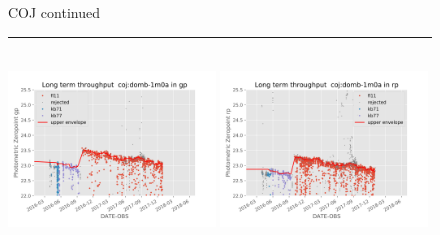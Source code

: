 \documentclass[draft]{spieman}
\begin{document}
\begin{figure}\ContinuedFloat
\centering 
COJ continued \\ 
\rule{\textwidth}{0.4pt} \\

\includegraphics[width=0.49\textwidth]{images/photzptrend-coj-domb-1m0a-gp.png} \hspace*{\fill} 
\includegraphics[width=0.49\textwidth]{images/photzptrend-coj-domb-1m0a-rp.png} \\[1ex]


\end{figure}
\end{document}
